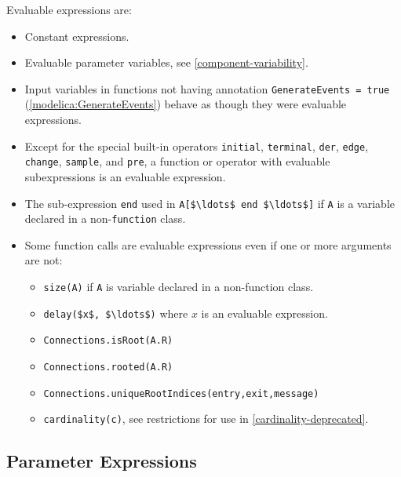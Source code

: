 Evaluable expressions are:
\begin{itemize}
\item
  Constant expressions.
\item
  Evaluable parameter variables, see \cref{component-variability}.
\item
  Input variables in functions not having annotation \lstinline!GenerateEvents = true! (\cref{modelica:GenerateEvents}) behave as though they were evaluable expressions.
\item
  Except for the special built-in operators \lstinline!initial!, \lstinline!terminal!, \lstinline!der!, \lstinline!edge!, \lstinline!change!, \lstinline!sample!, and \lstinline!pre!, a function or operator with evaluable subexpressions is an evaluable expression.
\item
  The sub-expression \lstinline!end! used in \lstinline!A[$\ldots$ end $\ldots$]! if \lstinline!A! is a variable declared in a non-\lstinline!function! class.
\item
  Some function calls are evaluable expressions even if one or more arguments are not:
  \begin{itemize}
  \item
    \lstinline!size(A)! if \lstinline!A! is variable declared in a non-function class.
  \item
    \lstinline!delay($x$, $\ldots$)! where $x$ is an evaluable expression.
  \item
    \lstinline!Connections.isRoot(A.R)!
  \item
    \lstinline!Connections.rooted(A.R)!
  \item
    \lstinline!Connections.uniqueRootIndices(entry,exit,message)!
  \item
    \lstinline!cardinality(c)!, see restrictions for use in \cref{cardinality-deprecated}.
  \end{itemize}
\end{itemize}

\subsection{Parameter Expressions}\label{parameter-expressions}

